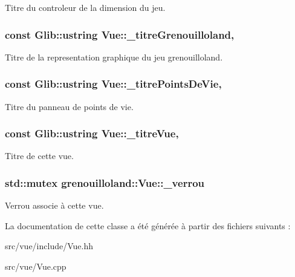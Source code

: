 Titre du controleur de la dimension du jeu. \hypertarget{classgrenouilloland_1_1Vue_a8f48d405d345306684f25471c377be4b}{
\subsubsection[{\-\_\-titre\-Grenouilloland}]{\setlength{\rightskip}{0pt plus 5cm}const Glib\-::ustring Vue\-::\-\_\-titre\-Grenouilloland\hspace{0.3cm}{\ttfamily [static]}, {\ttfamily [protected]}}}\label{classgrenouilloland_1_1Vue_a8f48d405d345306684f25471c377be4b}
Titre de la representation graphique du jeu grenouilloland. \hypertarget{classgrenouilloland_1_1Vue_adc86530a0f01ba959d5dcd48a96f8b95}{
\subsubsection[{\-\_\-titre\-Points\-De\-Vie}]{\setlength{\rightskip}{0pt plus 5cm}const Glib\-::ustring Vue\-::\-\_\-titre\-Points\-De\-Vie\hspace{0.3cm}{\ttfamily [static]}, {\ttfamily [protected]}}}\label{classgrenouilloland_1_1Vue_adc86530a0f01ba959d5dcd48a96f8b95}
Titre du panneau de points de vie. \hypertarget{classgrenouilloland_1_1Vue_a5adfea17feebe0674431b82d8215240e}{
\subsubsection[{\-\_\-titre\-Vue}]{\setlength{\rightskip}{0pt plus 5cm}const Glib\-::ustring Vue\-::\-\_\-titre\-Vue\hspace{0.3cm}{\ttfamily [static]}, {\ttfamily [protected]}}}\label{classgrenouilloland_1_1Vue_a5adfea17feebe0674431b82d8215240e}
Titre de cette vue. \hypertarget{classgrenouilloland_1_1Vue_ab6f850d86942bdef050596e90a34494e}{
\subsubsection[{\-\_\-verrou}]{\setlength{\rightskip}{0pt plus 5cm}std\-::mutex grenouilloland\-::\-Vue\-::\-\_\-verrou\hspace{0.3cm}{\ttfamily [protected]}}}\label{classgrenouilloland_1_1Vue_ab6f850d86942bdef050596e90a34494e}
Verrou associe à cette vue. 

La documentation de cette classe a été générée à partir des fichiers suivants \-:\begin{DoxyCompactItemize}
\item 
src/vue/include/Vue.\-hh\item 
src/vue/Vue.\-cpp\end{DoxyCompactItemize}
